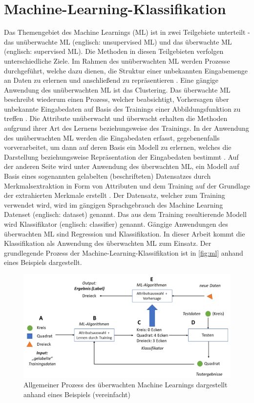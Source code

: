 \section{Machine-Learning-Klassifikation}
\label{classification}

Das Themengebiet des Machine Learnings (ML) ist in zwei Teilgebiete unterteilt - das unüberwachte ML (englisch: unsupervised ML) und das überwachte ML (englisch: supervised ML). Die Methoden in diesen Teilgebieten verfolgen unterschiedliche Ziele. Im Rahmen des unüberwachten ML werden Prozesse durchgeführt, welche dazu dienen, die Struktur einer unbekannten Eingabemenge an Daten zu erlernen und anschließend zu repräsentieren \cite{Sammut2017}. Eine gängige Anwendung des unüberwachten ML ist das Clustering. Das überwachte ML beschreibt wiederum einen Prozess, welcher beabsichtigt, Vorhersagen über unbekannte Eingabedaten auf Basis des Trainings einer Abbildungsfunktion zu treffen \cite{Sammut2017}. Die Attribute \glqq unüberwacht\grqq{} und \glqq überwacht\grqq{} erhalten die Methoden aufgrund ihrer Art des Lernens beziehungsweise des Trainings. In der Anwendung des unüberwachten ML werden die Eingabedaten erfasst, gegebenenfalls vorverarbeitet, um dann auf deren Basis ein Modell zu erlernen, welches die Darstellung beziehungsweise Repräsentation der Eingabedaten bestimmt \cite{Alpaydin2010}. Auf der anderen Seite wird unter Anwendung des überwachten ML, ein Modell auf Basis eines sogenannten \glqq gelabelten\grqq{} (beschrifteten) Datensatzes durch Merkmalsextraktion in Form von Attributen und dem Training auf der Grundlage der extrahierten Merkmale erstellt \cite{Alpaydin2010}. Der Datensatz, welcher zum Training verwendet wird, wird im gängigen Sprachgebrauch des Machine Learning Datenset (englisch: dataset) genannt. Das aus dem Training resultierende Modell wird Klassifikator (englisch: classifier) genannt. Gängige Anwendungen des überwachten ML sind Regression und Klassifikation. In dieser Arbeit kommt die Klassifikation als Anwendung des überwachten ML zum Einsatz. Der grundlegende Prozess der Machine-Learning-Klassifikation ist in \autoref{fig:ml} anhand eines Beispiels dargestellt.

\begin{figure}[t]
    \centering
    \captionsetup{justification=centering,margin=2cm}
    \includegraphics[width=\textwidth]{images/ML}
    \caption{Allgemeiner Prozess des überwachten Machine Learnings dargestellt anhand eines Beispiels (vereinfacht)}\label{fig:ml}
\end{figure}

